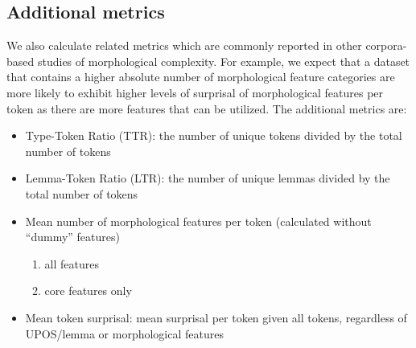 \documentclass[USenglish]{article}
\begin{document}
\subsection{Additional metrics}
We also calculate related metrics which are commonly reported in other corpora-based studies of morphological complexity. 
For example, we expect that a dataset that contains a higher absolute number of morphological feature categories are more likely to exhibit higher levels of surprisal of morphological features per token as there are more features that can be utilized.
The additional metrics are:
\begin{itemize}
  \setcounter{enumi}{1}  %
  \item Type-Token Ratio (TTR): the number of unique tokens divided by the total number of tokens
  \item Lemma-Token Ratio (LTR): the number of unique lemmas divided by the total number of tokens
  \item Mean number of morphological features per token (calculated without ``dummy'' features)
      \begin{enumerate}
  \renewcommand{\labelenumi}{\alph{enumi})}
  \item all features
  \item core features only
 \end{enumerate}
   \item Mean token surprisal: mean surprisal per token given all tokens, regardless of UPOS/lemma or morphological features
\end{itemize}
\end{document}
